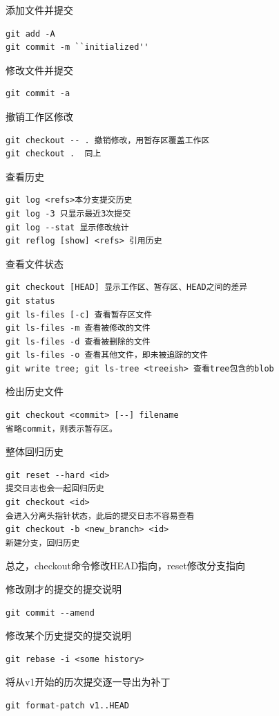 添加文件并提交

\begin{verbatim}
git add -A
git commit -m ``initialized''
\end{verbatim}


修改文件并提交
\begin{verbatim}
git commit -a
\end{verbatim}

撤销工作区修改
\begin{verbatim}
git checkout -- . 撤销修改，用暂存区覆盖工作区
git checkout .  同上
\end{verbatim}

查看历史
\begin{verbatim}
git log <refs>本分支提交历史
git log -3 只显示最近3次提交
git log --stat 显示修改统计
git reflog [show] <refs> 引用历史
\end{verbatim}

查看文件状态
\begin{verbatim}
git checkout [HEAD] 显示工作区、暂存区、HEAD之间的差异
git status
git ls-files [-c] 查看暂存区文件
git ls-files -m 查看被修改的文件
git ls-files -d 查看被删除的文件
git ls-files -o 查看其他文件，即未被追踪的文件
git write tree; git ls-tree <treeish> 查看tree包含的blob
\end{verbatim}

检出历史文件
\begin{verbatim}
git checkout <commit> [--] filename
省略commit，则表示暂存区。
\end{verbatim}

整体回归历史
\begin{verbatim}
git reset --hard <id> 
提交日志也会一起回归历史
git checkout <id> 
会进入分离头指针状态，此后的提交日志不容易查看
git checkout -b <new_branch> <id>
新建分支，回归历史
\end{verbatim}
总之，checkout命令修改HEAD指向，reset修改分支指向

修改刚才的提交的提交说明
\begin{verbatim}
git commit --amend
\end{verbatim}

修改某个历史提交的提交说明
\begin{verbatim}
git rebase -i <some history>
\end{verbatim}

将从v1开始的历次提交逐一导出为补丁
\begin{verbatim}
git format-patch v1..HEAD
\end{verbatim}

